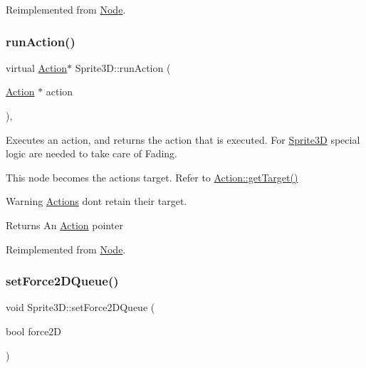 Reimplemented from \hyperlink{classNode_a07b8c313d5c753c5dbabbe68c77f3128}{Node}.

\mbox{\label{classSprite3D_acd2905d934e4d7c873b8a1973297d2a8}} 
\subsubsection{\texorpdfstring{run\+Action()}{runAction()}\hspace{0.1cm}{\footnotesize\ttfamily [2/2]}}
{\footnotesize\ttfamily virtual \hyperlink{classAction}{Action}$\ast$ Sprite3\+D\+::run\+Action (\begin{DoxyParamCaption}\item[{\hyperlink{classAction}{Action} $\ast$}]{action }\end{DoxyParamCaption})\hspace{0.3cm}{\ttfamily [override]}, {\ttfamily [virtual]}}

Executes an action, and returns the action that is executed. For \hyperlink{classSprite3D}{Sprite3D} special logic are needed to take care of Fading.

This node becomes the action\textquotesingle{}s target. Refer to \hyperlink{classAction_a696d1ef82807cc18207ba93d59d6ca16}{Action\+::get\+Target()} \begin{DoxyWarning}{Warning}
\hyperlink{classActions}{Actions} don\textquotesingle{}t retain their target.
\end{DoxyWarning}
\begin{DoxyReturn}{Returns}
An \hyperlink{classAction}{Action} pointer 
\end{DoxyReturn}


Reimplemented from \hyperlink{classNode_a07b8c313d5c753c5dbabbe68c77f3128}{Node}.

\mbox{\label{classSprite3D_af1ed52e0440a81ce14577834b5073e1d}} 
\subsubsection{\texorpdfstring{set\+Force2\+D\+Queue()}{setForce2DQueue()}\hspace{0.1cm}{\footnotesize\ttfamily [1/2]}}
{\footnotesize\ttfamily void Sprite3\+D\+::set\+Force2\+D\+Queue (\begin{DoxyParamCaption}\item[{bool}]{force2D }\end{DoxyParamCaption})}

